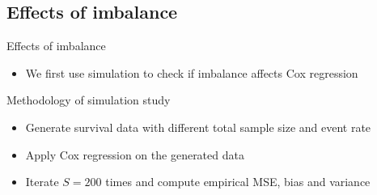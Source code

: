 \documentclass{beamer}
\begin{document}
\subsection{Effects of imbalance}
    \begin{frame}{Effects of imbalance}
    \begin{itemize}
        \item We first use simulation to check if imbalance affects Cox regression
    \end{itemize}
    \begin{exampleblock}{Methodology of simulation study}
    \begin{itemize}
        \item Generate survival data with different total sample size and event rate
        \item Apply Cox regression on the generated data
        \item Iterate $S=200$ times and compute empirical MSE, bias and variance 
    \end{itemize}
    \end{exampleblock}
        
    \end{frame}
\end{document}

